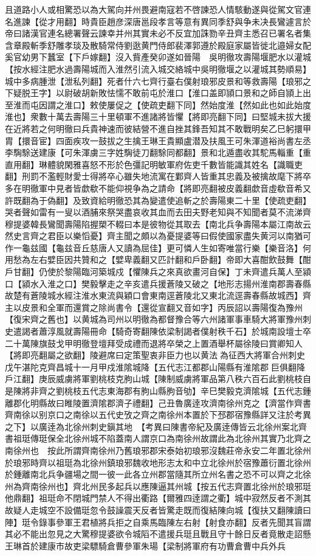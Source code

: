 且道路小人或相驚恐以為大駕向并州畏避南寇若不啓諫恐人情駭動遂與從駕文官連名進諫【從才用翻】時貴臣趙彦深唐邕段孝言等意有異同季舒與争未决長鸞遽言於帝曰諸漢官連名總署聲云諫幸并州其實未必不反宜加誅勠辛丑齊主悉召已署名者集含章殿斬季舒雕孝琰及散騎常侍劉逖黄門侍郎裴澤郭遵於殿庭家屬皆徙北邉婦女配奚官幼男下蠶室【下戶嫁翻】沒入貲產癸卯遂如晉陽　吳明徹攻壽陽堰肥水以灌城【按水經注肥水過壽陽城而入淮然引流入城交絡城中吳明徹堰之以灌城其勢順易】城中多病腫泄【泄私列翻】死者什六七齊行臺右僕射琅邪皮景和等救壽陽【琅邪之下疑脱王字】以尉破胡新敗怯懦不敢前屯於淮口【淮口盖即頴口景和之師自頴上出至淮而屯因謂之淮口】敕使屢促之【使疏吏翻下同】然始度淮【然如此也如此始度淮也】衆數十萬去壽陽三十里頓軍不進諸將皆懼【將即亮翻下同】曰堅城未拔大援在近將若之何明徹曰兵貴神速而彼結營不進自挫其鋒吾知其不敢戰明矣乙巳躬擐甲胄【擐音宦】四面疾攻一鼓拔之生擒王琳王貴顯盧潜及扶風王可朱渾道裕尚書左丞李騊駼送建康【可朱渾虜三字姓騊徒刀翻駼同都翻】景和北遁盡收其駝馬輜重【重直用翻】琳體貌閑雅喜怒不形於色彊記明敏軍府佐吏千數皆能識其姓名【識職吏翻】刑罰不濫輕財愛士得將卒心雖失地流寓在鄴齊人皆重其忠義及被擒故麾下將卒多在明徹軍中見者皆歔欷不能仰視争為之請命【將即亮翻被皮義翻歔音虛欷音希又許既翻為于偽翻】及致資給明徹恐其為變遣使追斬之於壽陽東二十里【使疏吏翻】哭者聲如雷有一叟以酒脯來祭哭盡哀收其血而去田夫野老知與不知聞者莫不流涕齊穆提婆韓長鸞聞壽陽陷握槊不輟曰本是彼物從其取去【南北兵争壽陽本屬江南故云然史言齊之君臣以樂慆憂】齊主聞之頗以為憂提婆等曰假使國家盡失黄河以南猶可作一龜兹國【龜兹音丘慈唐人又讀為屈佳】更可憐人生如寄唯當行樂【樂音洛】何用愁為左右嬖臣因共贊和之【嬖卑義翻又匹計翻和戶卧翻】帝即大喜酣飲鼓舞【酣戶甘翻】仍使於黎陽臨河築城戍【懼陳兵之來真欲畫河自保】丁未齊遣兵萬人至潁口【潁水入淮之口】樊毅擊走之辛亥遣兵援蒼陵又破之【地形志揚州淮南郡壽春縣故楚有蒼陵城水經注淮水東流與穎口會東南逕蒼陵北又東北流逕壽春縣故城西】齊主以皮景和全軍而還賞之除尚書令【還從宣翻又音如字】丙辰詔以壽陽復為豫州【復宋齊之舊也】以黄城為司州以明徹為都督豫合等六州諸軍事車騎大將軍豫州刺史遣謁者蕭淳風就壽陽冊命【騎奇寄翻陳依梁制謁者僕射秩千石】於城南設壇士卒二十萬陳旗鼓戈甲明徹登壇拜受成禮而退將卒榮之上置酒舉杯屬徐陵曰賞卿知人【將即亮翻屬之欲翻】陵避席曰定策聖衷非臣力也以黄法為征西大將軍合州刺史戊午湛陀克齊昌城十一月甲戍淮隂城降【五代志江都郡山陽縣有淮隂郡巨俱翻降戶江翻】庚辰威虜將軍劉桃枝克朐山城【陳制威虜將軍品第八秩六百石此劉桃枝自是陳將非齊之劉桃枝五代志東海郡有朐山縣朐音劬】辛巳樊毅克濟隂城【五代志鍾離郡化明縣故曰睢陵置濟隂郡濟子禮翻】己丑魯廣逹攻濟南徐州克之【濟當作齊書齊南徐以别京口之南徐以五代史攷之齊之南徐州本置於下邳郡宿豫縣詳又注於考異之下】以廣逹為北徐州刺史鎭其地　【考異曰陳書帝紀及廣逹傳皆云北徐州案北齊書祖珽傳珽保全北徐州城不陷蓋南人謂京口為南徐州故謂此為北徐州其實乃北齊之南徐州也　按此所謂齊南徐州乃舊琅邪郡宋泰始初琅邪沒魏莊帝永安二年置北徐州於琅邪時齊以祖珽為北徐州鎮琅邪魏收地形志太和中立北徐州於宿豫蕭衍置北徐州於鍾離南北兵争疆場之間一彼一此各立州郡當隨其所立州名書之恐不可以齊之北徐州為齊南徐州也】齊北州民多起兵以應陳逼其州城【按五代志齊置北徐州於琅邪珽他鼎翻】祖珽命不閉城門禁人不得出衢路【爾雅四逹謂之衢】城中寂然反者不測其故疑人走城空不設備珽忽令鼓譟震天反者皆驚走既而復結陳向城【復扶又翻陳讀曰陣】珽令錄事參軍王君植將兵拒之自乘馬臨陳左右射【射食亦翻】反者先聞其盲謂其必不能出忽見之大驚穆提婆欲令城䧟不遣援兵珽且戰且守十餘日反者竟散走詔懸王琳首於建康市故吏梁驃騎倉曹參軍朱瑒【梁制將軍府有功曹倉曹中兵外兵
